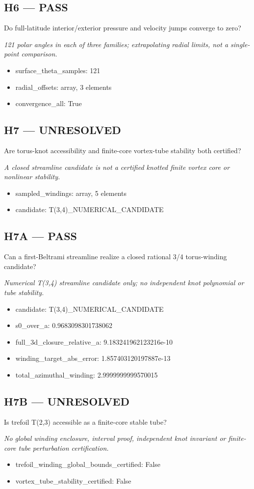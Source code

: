 \documentclass[10pt,a4paper]{article}
\begin{document}
\subsection*{H6 --- PASS}
Do full-latitude interior/exterior pressure and velocity jumps converge to zero?
\par\textit{121 polar angles in each of three families; extrapolating radial limits, not a single-point comparison.}\par
\begin{itemize}
\item surface\_theta\_samples: 121
\item radial\_offsets: array, 3 elements
\item convergence\_all: True
\end{itemize}
\subsection*{H7 --- UNRESOLVED}
Are torus-knot accessibility and finite-core vortex-tube stability both certified?
\par\textit{A closed streamline candidate is not a certified knotted finite vortex core or nonlinear stability.}\par
\begin{itemize}
\item sampled\_windings: array, 5 elements
\item candidate: T(3,4)\_NUMERICAL\_CANDIDATE
\end{itemize}
\subsection*{H7A --- PASS}
Can a first-Beltrami streamline realize a closed rational 3/4 torus-winding candidate?
\par\textit{Numerical T(3,4) streamline candidate only; no independent knot polynomial or tube stability.}\par
\begin{itemize}
\item candidate: T(3,4)\_NUMERICAL\_CANDIDATE
\item s0\_over\_a: 0.9683098301738062
\item full\_3d\_closure\_relative\_a: 9.183241962123216e-10
\item winding\_target\_abs\_error: 1.857403120197887e-13
\item total\_azimuthal\_winding: 2.9999999999570015
\end{itemize}
\subsection*{H7B --- UNRESOLVED}
Is trefoil T(2,3) accessible as a finite-core stable tube?
\par\textit{No global winding enclosure, interval proof, independent knot invariant or finite-core tube perturbation certification.}\par
\begin{itemize}
\item trefoil\_winding\_global\_bounds\_certified: False
\item vortex\_tube\_stability\_certified: False
\end{itemize}
\end{document}
